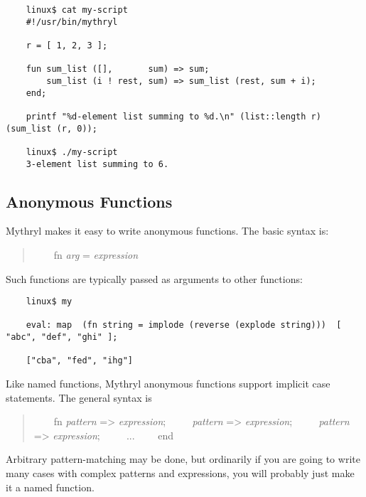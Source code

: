 \begin{verbatim}
    linux$ cat my-script
    #!/usr/bin/mythryl

    r = [ 1, 2, 3 ];

    fun sum_list ([],       sum) => sum;
        sum_list (i ! rest, sum) => sum_list (rest, sum + i);
    end;

    printf "%d-element list summing to %d.\n" (list::length r) (sum_list (r, 0));

    linux$ ./my-script
    3-element list summing to 6.
\end{verbatim}


\cutend*



\subsection{Anonymous Functions}
\label{section:ref:functions:anonymous-functions}

Mythryl makes it easy to write anonymous functions.
The basic syntax is:

\begin{quotation}
~~~~fn {\it arg} = {\it expression} 
\end{quotation}

Such functions are typically 
passed as arguments to other functions:

\begin{verbatim}
    linux$ my

    eval: map  (fn string = implode (reverse (explode string)))  [ "abc", "def", "ghi" ];

    ["cba", "fed", "ihg"]
\end{verbatim}

Like named functions, Mythryl anonymous functions support implicit case 
statements.  The general syntax is

\begin{quotation}
~~~~fn {\it pattern} => {\it expression}; \newline
~~~~   {\it pattern} => {\it expression};  \newline
~~~~   {\it pattern} => {\it expression}; \newline
~~~~   ... \newline
~~~~end
\end{quotation}

Arbitrary pattern-matching may be done, but ordinarily if you 
are going to write many cases with complex patterns and  
expressions, you will probably just make it a named function.

